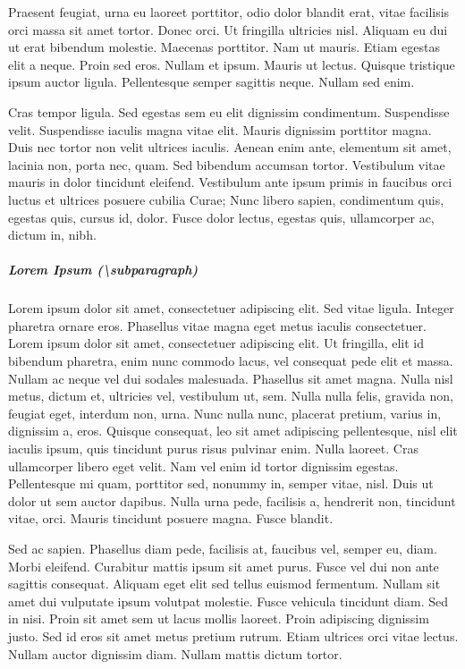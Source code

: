 \documentclass[nochapterpage,bigchapter,linedtoc,longdoc,colorback,accentcolor=tud4c]{tudreport}
\begin{document}
    Praesent feugiat, urna eu laoreet porttitor, odio dolor blandit erat, vitae facilisis orci massa sit amet tortor. Donec orci. Ut fringilla ultricies nisl. Aliquam eu dui ut erat bibendum molestie. Maecenas porttitor. Nam ut mauris. Etiam egestas elit a neque. Proin sed eros. Nullam et ipsum. Mauris ut lectus. Quisque tristique ipsum auctor ligula. Pellentesque semper sagittis neque. Nullam sed enim.

    Cras tempor ligula. Sed egestas sem eu elit dignissim condimentum. Suspendisse velit. Suspendisse iaculis magna vitae elit. Mauris dignissim porttitor magna. Duis nec tortor non velit ultrices iaculis. Aenean enim ante, elementum sit amet, lacinia non, porta nec, quam. Sed bibendum accumsan tortor. Vestibulum vitae mauris in dolor tincidunt eleifend. Vestibulum ante ipsum primis in faucibus orci luctus et ultrices posuere cubilia Curae; Nunc libero sapien, condimentum quis, egestas quis, cursus id, dolor. Fusce dolor lectus, egestas quis, ullamcorper ac, dictum in, nibh.

  \subparagraph{Lorem Ipsum (\textbackslash subparagraph)}

    Lorem ipsum dolor sit amet, consectetuer adipiscing elit. Sed vitae ligula. Integer pharetra ornare eros. Phasellus vitae magna eget metus iaculis consectetuer. Lorem ipsum dolor sit amet, consectetuer adipiscing elit. Ut fringilla, elit id bibendum pharetra, enim nunc commodo lacus, vel consequat pede elit et massa. Nullam ac neque vel dui sodales malesuada. Phasellus sit amet magna. Nulla nisl metus, dictum et, ultricies vel, vestibulum ut, sem. Nulla nulla felis, gravida non, feugiat eget, interdum non, urna. Nunc nulla nunc, placerat pretium, varius in, dignissim a, eros. Quisque consequat, leo sit amet adipiscing pellentesque, nisl elit iaculis ipsum, quis tincidunt purus risus pulvinar enim. Nulla laoreet. Cras ullamcorper libero eget velit. Nam vel enim id tortor dignissim egestas. Pellentesque mi quam, porttitor sed, nonummy in, semper vitae, nisl. Duis ut dolor ut sem auctor dapibus. Nulla urna pede, facilisis a, hendrerit non, tincidunt vitae, orci. Mauris tincidunt posuere magna. Fusce blandit.

    Sed ac sapien. Phasellus diam pede, facilisis at, faucibus vel, semper eu, diam. Morbi eleifend. Curabitur mattis ipsum sit amet purus. Fusce vel dui non ante sagittis consequat. Aliquam eget elit sed tellus euismod fermentum. Nullam sit amet dui vulputate ipsum volutpat molestie. Fusce vehicula tincidunt diam. Sed in nisi. Proin sit amet sem ut lacus mollis laoreet. Proin adipiscing dignissim justo. Sed id eros sit amet metus pretium rutrum. Etiam ultrices orci vitae lectus. Nullam auctor dignissim diam. Nullam mattis dictum tortor.
\end{document}
